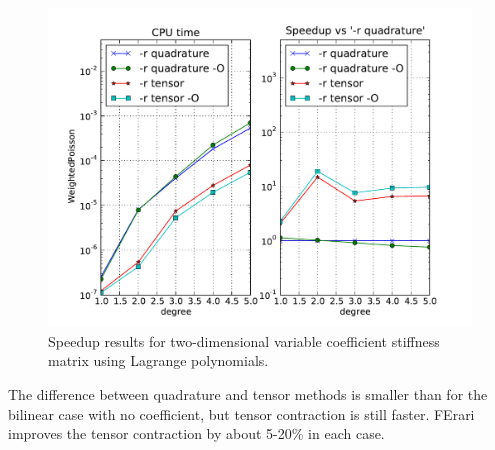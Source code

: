 \begin{figure}
\bwfig
  \centering
  \includegraphics[width=\largefig]{chapters/kirby-3/pdf/WeightedPoisson.pdf}
  \caption{Speedup results for two-dimensional variable coefficient
    stiffness matrix using Lagrange polynomials.}
  \label{fig:WeightedPoisson}
\end{figure}
The difference between quadrature and tensor methods is smaller than
for the bilinear case with no coefficient, but tensor contraction is
still faster. FErari improves the tensor contraction by about 5-20\%
in each case.

